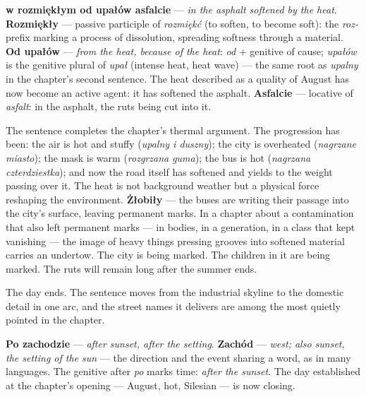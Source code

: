 \textbf{w rozmiękłym od upałów asfalcie} ---
\textit{in the asphalt softened by the heat}.
\textbf{Rozmiękły} --- passive participle of
\textit{rozmiękć} (to soften, to become soft):
the \textit{roz-} prefix marking a process of
dissolution, spreading softness through a material.
\textbf{Od upałów} --- \textit{from the heat,
because of the heat}: \textit{od} + genitive of
cause; \textit{upałów} is the genitive plural of
\textit{upał} (intense heat, heat wave) --- the
same root as \textit{upalny} in the chapter's
second sentence. The heat described as a quality
of August has now become an active agent: it has
softened the asphalt. \textbf{Asfalcie} ---
locative of \textit{asfalt}: in the asphalt, the
ruts being cut into it.

\medskip
The sentence completes the chapter's thermal
argument. The progression has been: the air is
hot and stuffy (\textit{upalny i duszny}); the
city is overheated (\textit{nagrzane miasto});
the mask is warm (\textit{rozgrzana guma}); the
bus is hot (\textit{nagrzana czterdziestka});
and now the road itself has softened and yields
to the weight passing over it. The heat is not
background weather but a physical force reshaping
the environment. \textbf{Żłobiły} --- the buses
are writing their passage into the city's surface,
leaving permanent marks. In a chapter about a
contamination that also left permanent marks ---
in bodies, in a generation, in a class that kept
vanishing --- the image of heavy things pressing
grooves into softened material carries an
undertow. The city is being marked. The children
in it are being marked. The ruts will remain long
after the summer ends.



The day ends. The sentence moves from the industrial
skyline to the domestic detail in one arc, and the
street names it delivers are among the most quietly
pointed in the chapter.

\textbf{Po zachodzie} --- \textit{after sunset, after
the setting}. \textbf{Zachód} --- \textit{west; also
sunset, the setting of the sun} --- the direction and
the event sharing a word, as in many languages. The
genitive after \textit{po} marks time: \textit{after
the sunset}. The day established at the chapter's
opening --- August, hot, Silesian --- is now closing.

